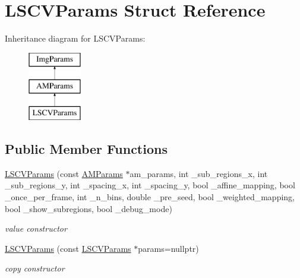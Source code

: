 \hypertarget{structLSCVParams}{\section{L\-S\-C\-V\-Params Struct Reference}
\label{structLSCVParams}
}
Inheritance diagram for L\-S\-C\-V\-Params\-:\begin{figure}[H]
\begin{center}
\leavevmode
\includegraphics[height=3.000000cm]{structLSCVParams}
\end{center}
\end{figure}
\subsection*{Public Member Functions}
\begin{DoxyCompactItemize}
\item 
\hypertarget{structLSCVParams_ab5b453d6c999a0a14e49816384ec370e}{\hyperlink{structLSCVParams_ab5b453d6c999a0a14e49816384ec370e}{L\-S\-C\-V\-Params} (const \hyperlink{structAMParams}{A\-M\-Params} $\ast$am\-\_\-params, int \-\_\-sub\-\_\-regions\-\_\-x, int \-\_\-sub\-\_\-regions\-\_\-y, int \-\_\-spacing\-\_\-x, int \-\_\-spacing\-\_\-y, bool \-\_\-affine\-\_\-mapping, bool \-\_\-once\-\_\-per\-\_\-frame, int \-\_\-n\-\_\-bins, double \-\_\-pre\-\_\-seed, bool \-\_\-weighted\-\_\-mapping, bool \-\_\-show\-\_\-subregions, bool \-\_\-debug\-\_\-mode)}\label{structLSCVParams_ab5b453d6c999a0a14e49816384ec370e}

\begin{DoxyCompactList}\small\item\em value constructor \end{DoxyCompactList}\item 
\hypertarget{structLSCVParams_a6c5efcf758424874d905a0367488b643}{\hyperlink{structLSCVParams_a6c5efcf758424874d905a0367488b643}{L\-S\-C\-V\-Params} (const \hyperlink{structLSCVParams}{L\-S\-C\-V\-Params} $\ast$params=nullptr)}\label{structLSCVParams_a6c5efcf758424874d905a0367488b643}

\begin{DoxyCompactList}\small\item\em copy constructor \end{DoxyCompactList}\end{DoxyCompactItemize}
